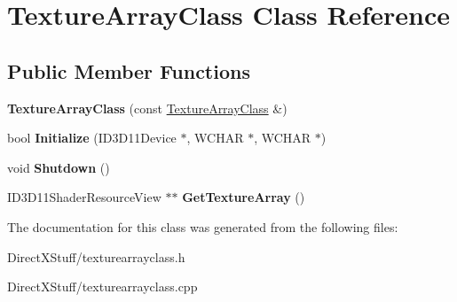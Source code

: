 \hypertarget{class_texture_array_class}{\section{Texture\-Array\-Class Class Reference}
\label{class_texture_array_class}
}
\subsection*{Public Member Functions}
\begin{DoxyCompactItemize}
\item 
\hypertarget{class_texture_array_class_a2b66f4c7b77758a1b7cc2a34ddbeb288}{{\bfseries Texture\-Array\-Class} (const \hyperlink{class_texture_array_class}{Texture\-Array\-Class} \&)}\label{class_texture_array_class_a2b66f4c7b77758a1b7cc2a34ddbeb288}

\item 
\hypertarget{class_texture_array_class_ae274fa2970e73481bfbcfe8fb44cf7f9}{bool {\bfseries Initialize} (I\-D3\-D11\-Device $\ast$, W\-C\-H\-A\-R $\ast$, W\-C\-H\-A\-R $\ast$)}\label{class_texture_array_class_ae274fa2970e73481bfbcfe8fb44cf7f9}

\item 
\hypertarget{class_texture_array_class_afd739171a406516ef6626ea75b00cf26}{void {\bfseries Shutdown} ()}\label{class_texture_array_class_afd739171a406516ef6626ea75b00cf26}

\item 
\hypertarget{class_texture_array_class_ac7f0062732f5ee138f8ede34ca47d4e2}{I\-D3\-D11\-Shader\-Resource\-View $\ast$$\ast$ {\bfseries Get\-Texture\-Array} ()}\label{class_texture_array_class_ac7f0062732f5ee138f8ede34ca47d4e2}

\end{DoxyCompactItemize}


The documentation for this class was generated from the following files\-:\begin{DoxyCompactItemize}
\item 
Direct\-X\-Stuff/texturearrayclass.\-h\item 
Direct\-X\-Stuff/texturearrayclass.\-cpp\end{DoxyCompactItemize}
